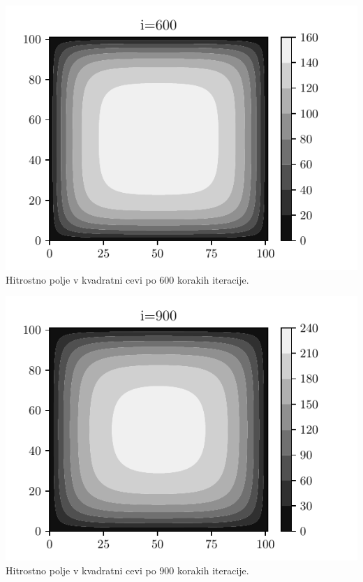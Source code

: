 \begin{center}
    \begin{minipage}{0.45\textwidth}
        \centering
    \includegraphics[width=\textwidth]{../old/0-kvadratna_i600.pdf}
    {Hitrostno polje v kvadratni cevi po 600 korakih iteracije.}
    \end{minipage}\hfill
    \begin{minipage}{0.45\textwidth}
        \centering
        \includegraphics[width=1\textwidth]{../old/0-kvadratna_i900.pdf}
    {Hitrostno polje v kvadratni cevi po 900 korakih iteracije. }
    \end{minipage}


\end{center}
